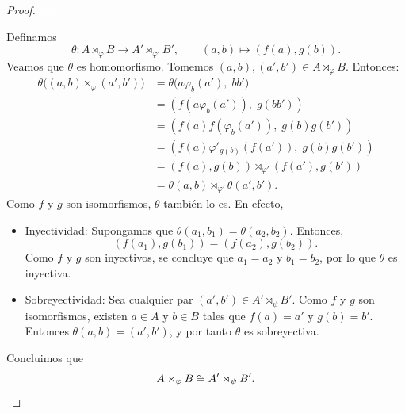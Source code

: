 \begin{proof}
	\textcolor{white}{text}
	
	\medskip
	\noindent 
	Definamos
	\[
	\theta: A \rtimes_{\varphi} B \longrightarrow A' \rtimes_{\varphi'} B', \qquad (a,b) \longmapsto \left(f(a), g(b)\right).
	\]
	Veamos que \( \theta \) es homomorfismo. Tomemos \( (a,b), (a',b') \in A \rtimes_{\varphi} B \). Entonces:
	\begin{align*}
		\theta\big((a,b) \rtimes_{\varphi} (a',b')\big) 
		&= \theta\big(a  \varphi_b(a'),\; bb'\big)\\
		&= \left(f\left(a  \varphi_b(a')\right),\; g(bb')\right)\\
		&= \left(f(a)  f(\varphi_b(a')),\; g(b)g(b')\right)\\
		&= \left(f(a)  \varphi'_{g(b)}(f(a')),\; g(b)g(b')\right)\\
		&= \left(f(a),g(b)\right) \rtimes_{\varphi'} \left(f(a'),g(b')\right)\\
		&= \theta(a,b) \rtimes_{\varphi'} \theta(a',b').
	\end{align*}
Como \(f\) y \(g\) son isomorfismos, \(\theta\) también lo es. En efecto,
\begin{itemize}
	\item Inyectividad: Supongamos que \( \theta(a_1, b_1) = \theta(a_2, b_2) \). Entonces,
	\[
	(f(a_1), g(b_1)) = (f(a_2), g(b_2)).
	\]
	Como \( f \) y \( g \) son inyectivos, se concluye que \( a_1 = a_2 \) y \( b_1 = b_2 \), por lo que \( \theta \) es inyectiva.
	
	\item Sobreyectividad: Sea cualquier par \( (a', b') \in A' \rtimes_{\psi} B' \). Como \( f \) y \( g \) son isomorfismos, existen \( a \in A \) y \( b \in B \) tales que \( f(a) = a' \) y \( g(b) = b' \). Entonces \( \theta(a, b) = (a', b') \), y por tanto \( \theta \) es sobreyectiva.
\end{itemize}
Concluimos que
\[
A \rtimes_{\varphi} B \cong A' \rtimes_{\psi} B'. \qedhere
\]

	
\end{proof}

